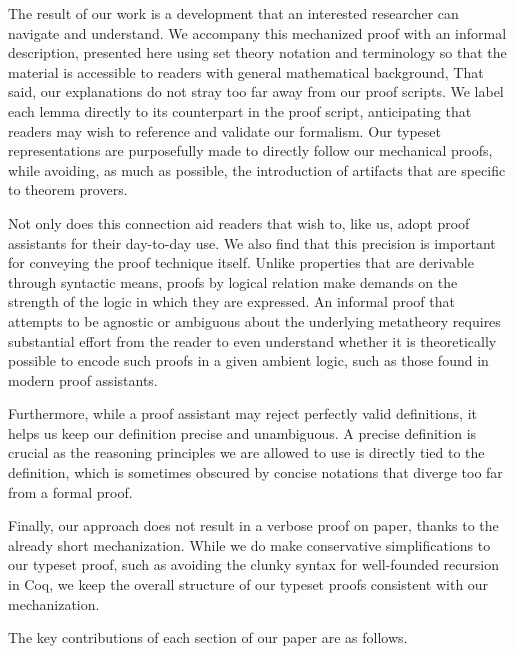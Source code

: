 \documentclass[acmsmall,screen=true,
\ifpublic review=false\else,review=true\fi
  ,anonymous=\ifanonymous true\else false\fi]{acmart}
\newcommand{\scw}[1]{}
\begin{document}
The result of our work is a development that an interested researcher can
navigate and understand. We accompany this mechanized proof with an informal
description, presented here using set theory notation and terminology so that
the material is accessible to readers with general mathematical background,
That said, our explanations do not stray too far away from our proof scripts.
We label each lemma directly to its counterpart in the proof script,
anticipating that readers may wish to reference and validate our formalism.
Our typeset representations are purposefully made to directly follow our
mechanical proofs, while avoiding, as much as possible, the introduction
of artifacts that are specific to theorem provers.

Not only does this connection aid readers that wish to, like us, adopt proof
assistants for their day-to-day use. We also find that this precision is
important for conveying the proof technique itself. Unlike properties that are
derivable through syntactic means, proofs by logical relation make demands on
the strength of the logic in which they are expressed. An informal proof that
attempts to be agnostic or ambiguous about the underlying
metatheory %
requires substantial
effort from the reader to even understand whether it is theoretically
possible to encode such proofs in a given ambient logic, such as those found
in modern proof assistants.

Furthermore, while a proof assistant may reject perfectly valid definitions,
it helps us keep our definition precise and unambiguous. A precise definition
is crucial as the reasoning principles we are allowed to use is directly tied
to the definition, which is sometimes obscured by concise notations that
diverge too far from a formal proof.

Finally, our approach does not result in a verbose proof on paper, thanks to
the already short mechanization. While we do make conservative simplifications
to our typeset proof, such as avoiding the clunky syntax for well-founded
recursion in Coq, we keep the overall structure of our typeset proofs
consistent with our mechanization.

The key contributions of each section of our paper are as follows.
\scw{I'm still not happy with this overview / contributions list. }
\end{document}
